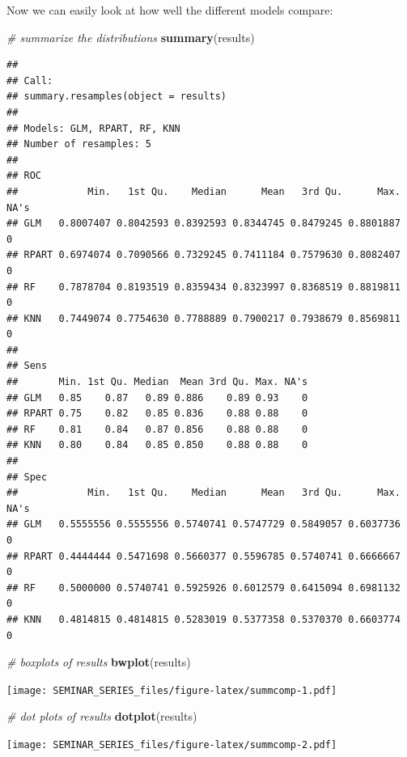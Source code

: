 \documentclass[]{book}
\newenvironment{Shaded}{\begin{snugshade}}{\end{snugshade}}
\newcommand{\KeywordTok}[1]{\textcolor[rgb]{0.13,0.29,0.53}{\textbf{#1}}}
\newcommand{\CommentTok}[1]{\textcolor[rgb]{0.56,0.35,0.01}{\textit{#1}}}
\newcommand{\NormalTok}[1]{#1}
\begin{document}
Now we can easily look at how well the different models compare:

\begin{Shaded}
\begin{Highlighting}[]
\CommentTok{# summarize the distributions}
\KeywordTok{summary}\NormalTok{(results)}
\end{Highlighting}
\end{Shaded}

\begin{verbatim}
## 
## Call:
## summary.resamples(object = results)
## 
## Models: GLM, RPART, RF, KNN 
## Number of resamples: 5 
## 
## ROC 
##            Min.   1st Qu.    Median      Mean   3rd Qu.      Max. NA's
## GLM   0.8007407 0.8042593 0.8392593 0.8344745 0.8479245 0.8801887    0
## RPART 0.6974074 0.7090566 0.7329245 0.7411184 0.7579630 0.8082407    0
## RF    0.7878704 0.8193519 0.8359434 0.8323997 0.8368519 0.8819811    0
## KNN   0.7449074 0.7754630 0.7788889 0.7900217 0.7938679 0.8569811    0
## 
## Sens 
##       Min. 1st Qu. Median  Mean 3rd Qu. Max. NA's
## GLM   0.85    0.87   0.89 0.886    0.89 0.93    0
## RPART 0.75    0.82   0.85 0.836    0.88 0.88    0
## RF    0.81    0.84   0.87 0.856    0.88 0.88    0
## KNN   0.80    0.84   0.85 0.850    0.88 0.88    0
## 
## Spec 
##            Min.   1st Qu.    Median      Mean   3rd Qu.      Max. NA's
## GLM   0.5555556 0.5555556 0.5740741 0.5747729 0.5849057 0.6037736    0
## RPART 0.4444444 0.5471698 0.5660377 0.5596785 0.5740741 0.6666667    0
## RF    0.5000000 0.5740741 0.5925926 0.6012579 0.6415094 0.6981132    0
## KNN   0.4814815 0.4814815 0.5283019 0.5377358 0.5370370 0.6603774    0
\end{verbatim}

\begin{Shaded}
\begin{Highlighting}[]
\CommentTok{# boxplots of results}
\KeywordTok{bwplot}\NormalTok{(results)}
\end{Highlighting}
\end{Shaded}

\texttt{[image: SEMINAR\_SERIES\_files/figure-latex/summcomp-1.pdf]}

\begin{Shaded}
\begin{Highlighting}[]
\CommentTok{# dot plots of results}
\KeywordTok{dotplot}\NormalTok{(results)}
\end{Highlighting}
\end{Shaded}

\texttt{[image: SEMINAR\_SERIES\_files/figure-latex/summcomp-2.pdf]}


\end{document}
